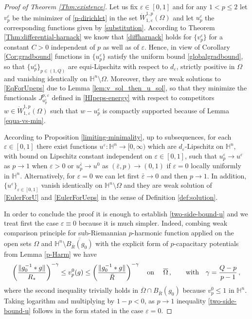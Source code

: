 \documentclass[10pt]{amsart}
\numberwithin{equation}{section}
\theoremstyle{definition}
\newcommand{\He}{\mathbb{H}}
\begin{document}
\begin{proof}[Proof of Theorem \ref{Thm:existence}]

Let  us fix $\varepsilon \in [0,1]$ and  for any $1<p\leq 2$  let $v^\varepsilon_p$ be the minimizer of \eqref{p-dirichlet} in the set $\dot{W}
^{1,p}_{1, \varepsilon} (\Omega)$ and let $u^\varepsilon_p$ the corresponding functions given by \eqref{substitution}. According to Theorem \ref{Thm:differential-harnack} we know that \eqref{diffharnack} holds for $\{ v^\varepsilon_p\}$ for a constant $C>0$ independent of $p$ as well as of $\varepsilon$. Hence, in view of Corollary \ref{Cor:gradbound} functions in  $\{ u^\varepsilon_p\}$ satisfy the uniform bound \eqref{globalgradbound}, so that $\{ u^\varepsilon_p\}_{p\in (1,Q)}$ are equi-Lipschitz with respect to $d_\varepsilon$, strictly positive in $\Omega$ and vanishing identically on $\He^n \setminus \Omega$. Moreover, they are weak solutions to \eqref{EqForUpeps} due to Lemma \ref{lem:v_sol_then_u_sol}, so that 
they minimize the functionals $J^{p,\varepsilon}_{u^\varepsilon_p}$ defined in \eqref{HIpeps-energy} with respect to competitors  $w \in\dot{W}
^{1,p}_{1, \varepsilon} (\Omega)$ such that $w-u^\varepsilon_p$ is compactly supported because of Lemma \ref{equa-vs-min}.

According to Proposition \ref{limiting-minimality}, up to subsequences, for each $\varepsilon \in [0,1]$ there exist functions $u^\varepsilon:\He^n \to [0,\infty)$ which are $d_\varepsilon$-Lipschitz on $\He^n$, with bound on Lipschitz constant independent on $\varepsilon \in [0,1]$,  such that  $u_{p}^{\varepsilon} \to u^\varepsilon$ as $p \to 1$ when $\varepsilon>0$ or $u_{p}^{\bar{\varepsilon}} \to u^0$ as $(\bar{\varepsilon}, p) \to (0,1)$ if $\varepsilon=0$ locally uniformly in $\He^n$.  Alternatively, for $\varepsilon=0$ we can let first $\bar{\varepsilon} \to 0$ and then $p \to 1$. In addition, $\{u^\varepsilon\}_{\varepsilon \in [0,1]}$  vanish identically on $\He^n \setminus \Omega$ and they are weak solution of \eqref{EulerForU} and \eqref{EulerForUeps} in the sense of Definition \ref{def:solution}.

In order to conclude the proof it is enough to establish \eqref{two-side-bound-u} and we treat first the case $\varepsilon \equiv 0$ because it is much simpler. Indeed, combing weak comparison principle for sub-Riemannian $p$-harmonic function applied on the open sets $\Omega$ and $\He^n \setminus \overline{B_{\bar{R}}(g_0)}$ with the explicit form of $p$-capacitary potentials from Lemma \ref{p-Harm} we have 
\begin{equation}
\label{two-side-bound-u0p}
 \left( \frac{\|  g_0^{-1} *g\|}{R_\ast} \right)^{-\gamma}  \leq v^0_p (g) \leq   \left( \frac{\|  g_0^{-1} *g\|}{\bar{R}} \right)^{-\gamma}  \quad \hbox{on } \quad \overline{\Omega} \, , \qquad \hbox{with} \quad \gamma=\frac{Q-p}{p-1} \, ,
\end{equation}
where the second inequality trivially holds in $\overline{\Omega}\cap B_{\bar{R}}(g_0)$ because $v^0_p \leq 1$ in $\He^n$. Taking logarithm and multiplying by $1-p<0$, as $p \to 1$ inequality \eqref{two-side-bound-u} follows in the form stated in the case $\varepsilon=0$.


\end{proof}
\end{document}
